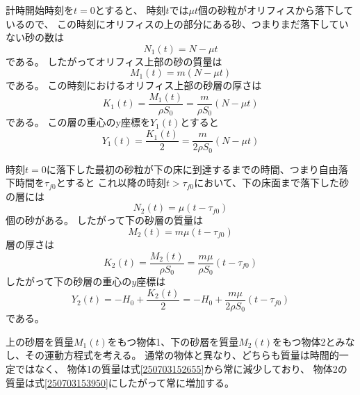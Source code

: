 \documentclass[]{article}
\begin{document}
計時開始時刻を$t=0$とすると、
時刻$t$では$\mu t$個の砂粒がオリフィスから落下しているので、
この時刻にオリフィスの上の部分にある砂、つまりまだ落下していない砂の数は
\begin{equation} \label{250703152453} 
   N_1(t) =  N - \mu t
\end{equation}
である。
したがってオリフィス上部の砂の質量は
\begin{equation} \label{250703152655} 
   M_1(t) = m (N-\mu t)
\end{equation}
である。
この時刻におけるオリフィス上部の砂層の厚さは
\begin{equation} \label{250703152748} 
   K_1(t) = \frac{M_1(t)}{\rho S_0} = \frac{m}{\rho S_0}(N-\mu t)
\end{equation}
である。
この層の重心のy座標を$Y_1(t)$とすると
\begin{equation} \label{250703153013} 
   Y_1(t) = \frac{K_1(t)}{2} = \frac{m}{2\rho S_0} ( N - \mu t)
\end{equation}


時刻$t=0$に落下した最初の砂粒が下の床に到達するまでの時間、つまり自由落下時間を$\tau_{f0}$とすると
これ以降の時刻$t>\tau_{f0}$において、下の床面まで落下した砂の層には
\begin{equation} \label{250703153525} 
   N_2(t) = \mu ( t - \tau_{f0})
\end{equation}
個の砂がある。
したがって下の砂層の質量は
\begin{equation} \label{250703153950} 
   M_2(t) = m\mu(t-\tau_{f0})
\end{equation}
層の厚さは
\begin{equation} \label{250703154021} 
   K_2(t) = \frac{M_2(t)}{\rho S_0} = \frac{m\mu}{\rho S_0} (t-\tau_{f0})
\end{equation}
したがって下の砂層の重心の$y$座標は
\begin{equation} \label{250703154424} 
   Y_2(t) = -H_0 + \frac{K_2(t)}{2} = -H_0 + \frac{m\mu}{2\rho S_0} (t-\tau_{f0})
\end{equation}
である。


上の砂層を質量$M_1(t)$をもつ物体1、下の砂層を質量$M_2(t)$をもつ物体2とみなし、その運動方程式を考える。
通常の物体と異なり、どちらも質量は時間的一定ではなく、
物体1の質量は式\eqref{250703152655}から常に減少しており、
物体2の質量は式\eqref{250703153950}にしたがって常に増加する。
\end{document}
